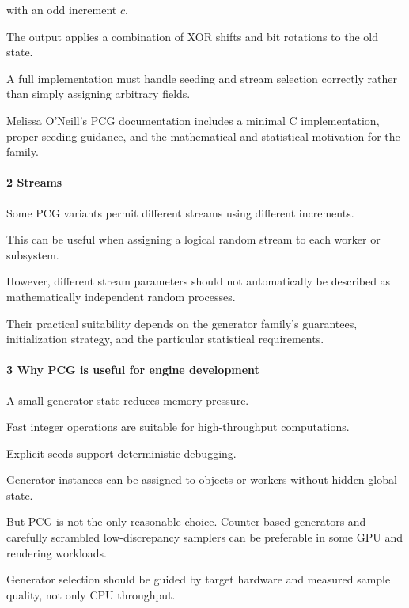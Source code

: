 with an odd increment \(c\).

The output applies a combination of XOR shifts and bit rotations to the old state.

A full implementation must handle seeding and stream selection correctly rather than simply assigning arbitrary fields.

Melissa O'Neill's PCG documentation includes a minimal C implementation, proper seeding guidance, and the mathematical and statistical motivation for the family.

\paragraph{2 Streams}\label{02-foundations-ii-ch029-streams}

\hypertarget{02-foundations-ii-ch029-streams}{}

Some PCG variants permit different streams using different increments.

This can be useful when assigning a logical random stream to each worker or subsystem.

However, different stream parameters should not automatically be described as mathematically independent random processes.

Their practical suitability depends on the generator family's guarantees, initialization strategy, and the particular statistical requirements.

\paragraph{3 Why PCG is useful for engine development}\label{02-foundations-ii-ch029-why-pcg-is-useful-for-engine-development}

\hypertarget{02-foundations-ii-ch029-why-pcg-is-useful-for-engine-development}{}

A small generator state reduces memory pressure.

Fast integer operations are suitable for high-throughput computations.

Explicit seeds support deterministic debugging.

Generator instances can be assigned to objects or workers without hidden global state.

But PCG is not the only reasonable choice. Counter-based generators and carefully scrambled low-discrepancy samplers can be preferable in some GPU and rendering workloads.

Generator selection should be guided by target hardware and measured sample quality, not only CPU throughput.

